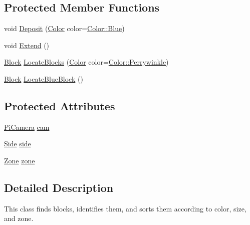 \subsection*{Protected Member Functions}
\begin{DoxyCompactItemize}
\item 
void \hyperlink{classChipChipArray_1_1Grabber_a44e5aeb908634f68de356ad8df3c4bf1}{Deposit} (\hyperlink{definitions_8hpp_abc05a0f46084a3477cf5d5c939ff1436}{Color} color=\hyperlink{definitions_8hpp_abc05a0f46084a3477cf5d5c939ff1436a9594eec95be70e7b1710f730fdda33d9}{Color\+::\+Blue})
\item 
void \hyperlink{classChipChipArray_1_1Grabber_abecb4047b4f7d5a7e691b7fb581b5a39}{Extend} ()
\item 
\hyperlink{classChipChipArray_1_1Block}{Block} \hyperlink{classChipChipArray_1_1Grabber_af49248c957a1695dcde79c0f5f8df99b}{Locate\+Blocks} (\hyperlink{definitions_8hpp_abc05a0f46084a3477cf5d5c939ff1436}{Color} color=\hyperlink{definitions_8hpp_abc05a0f46084a3477cf5d5c939ff1436a1e700ac224a6d34c5b171bb6f462aa41}{Color\+::\+Perrywinkle})
\item 
\hyperlink{classChipChipArray_1_1Block}{Block} \hyperlink{classChipChipArray_1_1Grabber_ab9b0d6a64b2c94c0d0f810a5ebeef6ec}{Locate\+Blue\+Block} ()
\end{DoxyCompactItemize}
\subsection*{Protected Attributes}
\begin{DoxyCompactItemize}
\item 
\hyperlink{classChipChipArray_1_1PiCamera}{Pi\+Camera} \hyperlink{classChipChipArray_1_1Grabber_a726bcc2367a719cb84de92a981947622}{cam}
\item 
\hyperlink{definitions_8hpp_a03325a8a9d4f105db5e37dd587128142}{Side} \hyperlink{classChipChipArray_1_1Grabber_a8afbaefae7c767c862fd1bf13968539b}{side}
\item 
\hyperlink{definitions_8hpp_adbd1e7a33d3e1751c7b2aa2562d0ecb9}{Zone} \hyperlink{classChipChipArray_1_1Grabber_ab57efe6e0b6f369b19528285a278d967}{zone}
\end{DoxyCompactItemize}


\subsection{Detailed Description}
This class finds blocks, identifies them, and sorts them according to color, size, and zone. 

